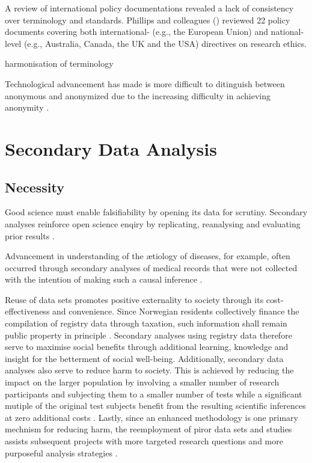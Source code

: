 \documentclass[
        a4paper, %
        12pt, %
        stu, %
        noextraspace, %
        floatsintext, %
        biblatex, %
        twoside, %
        colorlinks=true,        %
        linkcolor=red,          %
        anchorcolor=red,      %
        citecolor=blue,         %
        urlcolor=blue,          %
        bookmarks=true,         %
        bookmarksopen=false,    %
        bookmarksnumbered=true,  %
        dvipsnames
]{apa7}
\begin{document}
A review of international policy documentations revealed a lack of consistency over terminology and standards. Phillips and colleagues (\citeyear{phillips:2017}) reviewed 22 policy documents covering both international- (e.g., the European Union) and national-level (e.g., Australia, Canada, the UK and the USA) directives on research ethics.

harmonisation of terminology \parencite{phillips:2016}

Technological advancement has made is more difficult to ditinguish between anonymous and anonymized due to the increasing difficulty in achieving anonymity \parencite{tricouncil:2018}.

\section{Secondary Data Analysis}

\subsection{Necessity}

Good science must enable falsifiability by opening its data for scrutiny. Secondary analyses reinforce open science enqiry by replicating, reanalysing and evaluating prior results \parencite{hedrick:1985}.

Advancement in understanding of the {\ae}tiology of diseases, for example, often occurred through secondary analyses of medical records that were not collected with the intention of making such a causal inference \parencite{dale:1988}.

Reuse of data sets promotes positive externality to society through its cost-effectiveness and convenience. Since Norwegian residents collectively finance the compilation of registry data through taxation, such information shall remain public property in principle \parencite{daveysmith:1994}. Secondary analyses using registry data therefore serve to maximise social benefits through additional learning, knowledge and insight for the betterment of social well-being. Additionally, secondary data analyses also serve to reduce harm to society. This is achieved by reducing the impact on the larger population by involving a smaller number of research participants and subjecting them to a smaller number of tests while a significant mutiple of the original test subjects benefit from the resulting scientific inferences at zero additional costs \parencite{law:2005}. Lastly, since an enhanced methodology is one primary mechnism for reducing harm, the reemployment of piror data sets and studies assists subsequent projects with more targeted research questions and more purposeful analysis strategies \parencite{daveysmith:1994}.
\end{document}
